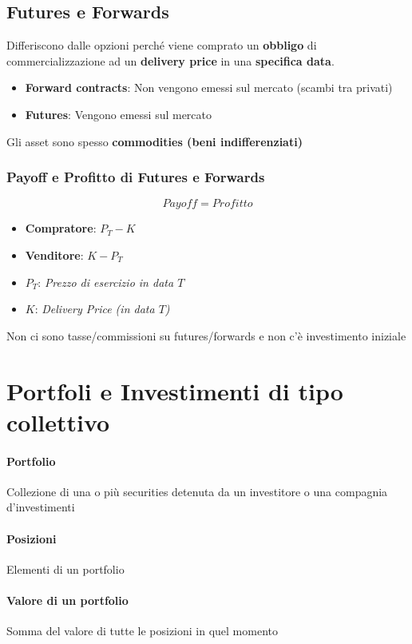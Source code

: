 \documentclass[12pt]{article}
\begin{document}
\subsection{Futures e Forwards}
Differiscono dalle opzioni perché viene comprato un \textbf{obbligo} di commercializzazione ad un \textbf{delivery price} in una \textbf{specifica data}.
\begin{itemize}
    \item \textbf{Forward contracts}: Non vengono emessi sul mercato (scambi tra privati)
    \item \textbf{Futures}: Vengono emessi sul mercato
\end{itemize}
Gli asset sono spesso \textbf{commodities (beni indifferenziati)}
\subsubsection{Payoff e Profitto di Futures e Forwards}
$$Payoff=Profitto$$
\begin{itemize}
    \item \textbf{Compratore}: $P_T - K$
    \item \textbf{Venditore}: $K - P_T$
\end{itemize}
\begin{itemize}[label=]
    \item $P_T$: \textit{Prezzo di esercizio in data $T$}
    \item $K$: \textit{Delivery Price (in data $T$)}
\end{itemize}
Non ci sono tasse/commissioni su futures/forwards e non c'è investimento iniziale

\newpage
\section{Portfoli e Investimenti di tipo collettivo}
\paragraph{Portfolio} Collezione di una o più securities detenuta da un investitore o una compagnia d'investimenti
\paragraph{Posizioni} Elementi di un portfolio
\paragraph{Valore di un portfolio} Somma del valore di tutte le posizioni in quel momento
\end{document}
